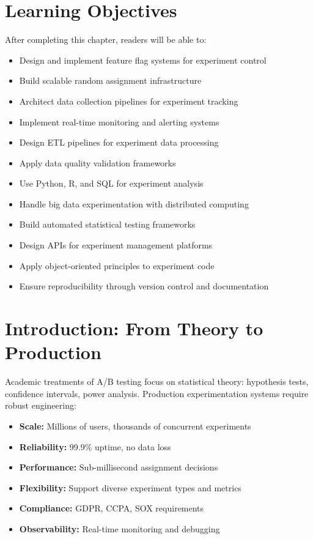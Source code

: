 
\section{Learning Objectives}

After completing this chapter, readers will be able to:
\begin{itemize}
    \item Design and implement feature flag systems for experiment control
    \item Build scalable random assignment infrastructure
    \item Architect data collection pipelines for experiment tracking
    \item Implement real-time monitoring and alerting systems
    \item Design ETL pipelines for experiment data processing
    \item Apply data quality validation frameworks
    \item Use Python, R, and SQL for experiment analysis
    \item Handle big data experimentation with distributed computing
    \item Build automated statistical testing frameworks
    \item Design APIs for experiment management platforms
    \item Apply object-oriented principles to experiment code
    \item Ensure reproducibility through version control and documentation
\end{itemize}

\section{Introduction: From Theory to Production}

Academic treatments of A/B testing focus on statistical theory: hypothesis tests, confidence intervals, power analysis. Production experimentation systems require robust engineering:

\begin{itemize}
    \item \textbf{Scale:} Millions of users, thousands of concurrent experiments
    \item \textbf{Reliability:} 99.9\% uptime, no data loss
    \item \textbf{Performance:} Sub-millisecond assignment decisions
    \item \textbf{Flexibility:} Support diverse experiment types and metrics
    \item \textbf{Compliance:} GDPR, CCPA, SOX requirements
    \item \textbf{Observability:} Real-time monitoring and debugging
\end{itemize}

